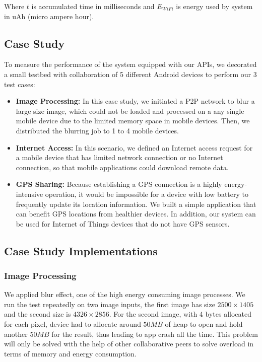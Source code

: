 \documentclass{sig-alternate}[10pt]
\begin{document}
Where $t$ is accumulated time in milliseconds and $E_{WiFi}$ is energy used by system in uAh (micro ampere hour).

\subsection{Case Study}
To measure the performance of the system equipped with our APIs, we decorated a small testbed with collaboration of 5 different Android devices to perform our 3 test cases:
\begin{itemize}
	\item \textbf{Image Processing:} In this case study, we initiated a P2P network to blur a large size image, which could not be loaded and processed on a any single mobile device due to the limited memory space in mobile devices. Then, we distributed the blurring job to 1 to 4 mobile devices. 
	\item \textbf{Internet Access:} In this scenario, we defined an Internet access request for a mobile device that has limited network connection or no Internet connection, so that mobile applications could download remote data.
	\item \textbf{GPS Sharing:} Because establishing a GPS connection is a highly energy-intensive operation, it would be impossible for a device with low battery to frequently update its location information. We built a simple application that can benefit GPS locations from healthier devices. In addition, our system can be used for Internet of Things devices that do not have GPS sensors.
\end{itemize}

\subsection{Case Study Implementations}

\subsubsection{Image Processing}
We applied blur effect, one of the high energy consuming image processes. We run the test repeatedly on two image inputs, the first image has size $2500 \times 1405$ and the second size is $4326 \times 2856$. For the second image, with 4 bytes allocated for each pixel, device had to allocate around $50MB$ of heap to open and hold another $50MB$ for the result, thus leading to app crash all the time. This problem will only be solved with the help of other collaborative peers to solve overload in terms of memory and energy consumption.
\end{document}
